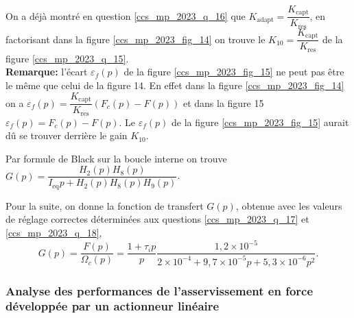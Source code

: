 \ifprof
\begin{corrige}
On a déjà montré en question \ref{ccs_mp_2023_q_16} que $K_{\text{adapt}} = \dfrac{K_{\text{capt}}}{K_{\text{res}}}$, en factorisant dans la figure \ref{ccs_mp_2023_fig_14} on trouve le $\boxed{K_{10} = \dfrac{K_{\text{capt}}}{K_{\text{res}}}}$ de la figure \ref{ccs_mp_2023_q_15}.\\

\textbf{Remarque:} l'écart $\varepsilon_f(p)$ de la figure \ref{ccs_mp_2023_fig_15} ne peut pas être le même que celui de la figure 14. En effet dans la figure \ref{ccs_mp_2023_fig_14} on a $\varepsilon_f(p) = \dfrac{K_{\text{capt}}}{K_{\text{res}}}\left( F_c(p) - F(p) \right)$ et dans la figure 15 $\varepsilon_f(p) = F_c(p) - F(p)$. Le $\varepsilon_f(p)$ de la figure \ref{ccs_mp_2023_fig_15} aurait dû se trouver derrière le gain $K_{10}$.


\end{corrige}
\else
\fi



\ifprof
\begin{corrige}
Par formule de Black sur la boucle interne on trouve $\boxed{G(p) = \dfrac{H_2(p) H_8(p)}{I_{\text{eq}}p + H_2(p)H_8(p)H_9(p)}}$.
\end{corrige}
\else
\fi

\ifprof
\else

Pour la suite, on donne la fonction de transfert $G(p)$, obtenue avec les valeurs de réglage correctes déterminées aux questions \ref{ccs_mp_2023_q_17} et \ref{ccs_mp_2023_q_18},
$$
G(p)=\frac{F(p)}{\Omega_{c}(p)}=\frac{1+\tau_{i} p}{p} \frac{1,2 \times 10^{-5}}{2 \times 10^{-4}+9,7 \times 10^{-5} p+5,3 \times 10^{-6} p^{2}} .
$$
\fi

\subsubsection{Analyse des performances de l'asservissement en force développée par un actionneur linéaire}%

